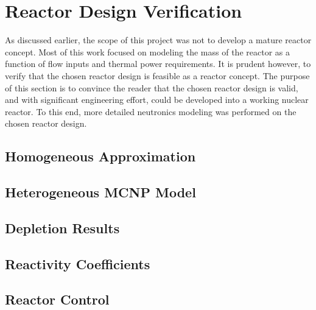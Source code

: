 \section{Reactor Design Verification}
    As discussed earlier, the scope of this project was not to develop a mature
reactor concept. Most of this work focused on modeling the mass of the
reactor as a function of flow inputs and thermal power requirements. It is
prudent however, to verify that the chosen reactor design is feasible as a
reactor concept. The purpose of this section is to convince the reader that
the chosen reactor design is valid, and with significant engineering effort,
could be developed into a working nuclear reactor. To this end, more detailed
neutronics modeling was performed on the chosen reactor design.

\subsection{Homogeneous Approximation}

\subsection{Heterogeneous MCNP Model}

\subsection{Depletion Results}

\subsection{Reactivity Coefficients}

\subsection{Reactor Control}
